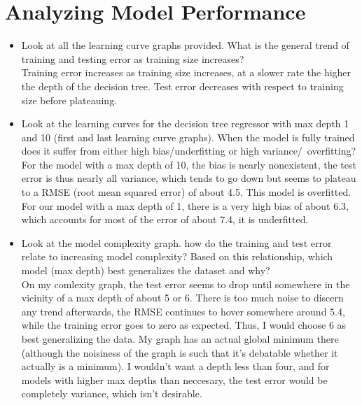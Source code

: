\documentclass{amsart}
\begin{document}
\section{Analyzing Model Performance}
\begin{itemize}
	\item Look at all the learning curve graphs provided.  What is the general trend of training and testing error as training size increases? \vspace{1mm}\\
		Training error increases as training size increases, at a slower rate the higher the depth of the decision tree.  Test error decreases with respect to training size before plateauing.\vspace{1mm}
	\item Look at the learning curves for the decision tree regressor with max depth 1 and 10 (first and last learning curve graphs).  When the model is fully trained does it suffer from either high bias/underfitting or high variance/\ overfitting? \vspace{1mm}\\
		For the model with a max depth of 10, the bias is nearly nonexistent, the test error is thus nearly all variance, which tends to go down but seems to plateau to a RMSE (root mean squared error) of about 4.5.  This model is overfitted.  For our model with a max depth of 1, there is a very high bias of about 6.3, which accounts for most of the error of about 7.4, it is underfitted.\vspace{1mm}
	\item Look at the model complexity graph.  how do the training and test error relate to increasing model complexity?  Based on this relationship, which model (max depth) best generalizes the dataset and why? \vspace{1mm}\\
		On my comlexity graph, the test error seems to drop until somewhere in the vicinity of a max depth of about 5 or 6.  There is too much noise to discern any trend afterwards, the RMSE continues to hover somewhere around 5.4, while the training error goes to zero as expected.  Thus, I would choose 6 as best generalizing the data.  My graph has an actual global minimum there (although the noisiness of the graph is such that it's debatable whether it actually is a minimum).  I wouldn't want a depth less than four, and for models with higher max depths than neccesary, the test error would be completely variance, which isn't desirable.
\end{itemize}
\end{document}
